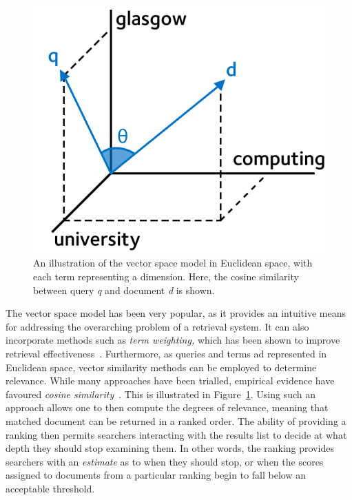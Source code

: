 \begin{figure}
    \begin{center}
    \vspace*{-10mm}
    \includegraphics[width=1\textwidth]{figures/ch2-vector.pdf}
    \end{center}
    \vspace*{-4mm}
    \caption[Vector space model (cosine similarity)]{An illustration of the vector space model in Euclidean space, with each term representing a dimension. Here, the cosine similarity between query \emph{q} and document \emph{d} is shown.}
    \label{fig:vector_space}
\end{figure}

The vector space model has been very popular, as it provides an intuitive means for addressing the overarching problem of a retrieval system. It can also incorporate methods such as \emph{term weighting,} which has been shown to improve retrieval effectiveness~\citep{croft2010search}. Furthermore, as queries and terms ad represented in Euclidean space, vector similarity methods can be employed to determine relevance. While many approaches have been trialled, empirical evidence have favoured \emph{cosine similarity}~\citep{croft2010search}. This is illustrated in Figure~\ref{fig:vector_space}. Using such an approach allows one to then compute the degrees of relevance, meaning that matched document can be returned in a ranked order. The ability of providing a ranking then permits searchers interacting with the results list to decide at what depth they should stop examining them. In other words, the ranking provides searchers with an \emph{estimate} as to when they should stop, or when the scores assigned to documents from a particular ranking begin to fall below an acceptable threshold.

